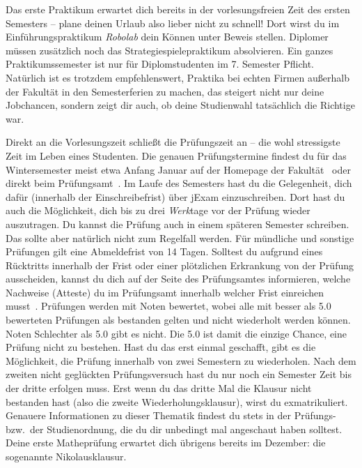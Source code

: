 Das erste Praktikum erwartet dich bereits in der vorlesungsfreien Zeit des ersten Semesters -- plane deinen Urlaub also lieber nicht zu schnell!
Dort wirst du im Einführungspraktikum \textit{Robolab} dein Können unter Beweis stellen. Diplomer müssen zusätzlich noch das Strategiespielepraktikum absolvieren.
Ein ganzes Praktikumssemester ist nur für Diplomstudenten im 7. Semester Pflicht.
Natürlich ist es trotzdem empfehlenswert, Praktika bei echten Firmen außerhalb der Fakultät in den Semesterferien zu machen, das steigert nicht nur deine Jobchancen,
sondern zeigt dir auch, ob deine Studienwahl tatsächlich die Richtige war.

\label{sec:pruefungen}
Direkt an die Vorlesungszeit schließt die Prüfungszeit an – die wohl stressigste Zeit im Leben eines Studenten.
Die genauen Prüfungstermine findest du für das Wintersemester meist etwa Anfang Januar auf der Homepage der Fakultät~ oder direkt beim Prüfungsamt~.
Im Laufe des Semesters hast du die Gelegenheit, dich dafür (innerhalb der Einschreibefrist) über jExam einzuschreiben.
Dort hast du auch die Möglichkeit, dich bis zu drei \emph{Werk}tage vor der Prüfung wieder auszutragen. Du kannst die Prüfung auch in einem späteren Semester schreiben. Das sollte aber natürlich nicht zum Regelfall werden. Für mündliche und sonstige Prüfungen gilt eine Abmeldefrist von 14 Tagen.
Solltest du aufgrund eines Rücktritts innerhalb der Frist oder einer plötzlichen Erkrankung von der Prüfung ausscheiden, kannst du dich auf der Seite des Prüfungsamtes informieren,
welche Nachweise (Atteste) du im Prüfungsamt innerhalb welcher Frist einreichen musst~.
Prüfungen werden mit Noten bewertet, wobei alle mit besser als 5.0 bewerteten Prüfungen als bestanden gelten und nicht wiederholt werden können.
Noten Schlechter als 5.0 gibt es nicht.
Die 5.0 ist damit die einzige Chance, eine Prüfung nicht zu bestehen.
Hast du das erst einmal geschafft, gibt es die Möglichkeit, die Prüfung innerhalb von zwei Semestern zu wiederholen.
Nach dem zweiten nicht geglückten Prüfungsversuch hast du nur noch ein Semester Zeit bis der dritte erfolgen muss.
Erst wenn du das dritte Mal die Klausur nicht bestanden hast (also die zweite Wiederholungsklausur), wirst du exmatrikuliert.
Genauere Informationen zu dieser Thematik findest du stets in der Prüfungs- bzw.\ der Studienordnung, die du dir unbedingt mal angeschaut haben solltest.
Deine erste Matheprüfung erwartet dich übrigens bereits im Dezember: die sogenannte Nikolausklausur.

